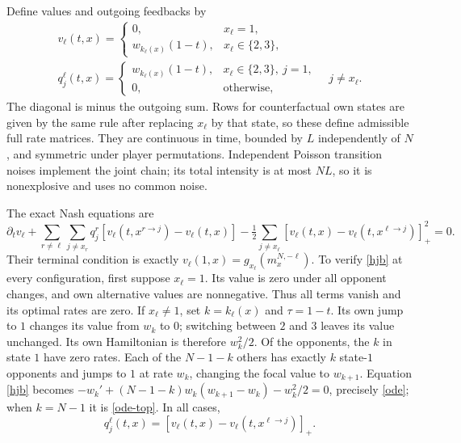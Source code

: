 \documentclass[11pt,a4paper]{article}
\begin{document}
Define values and outgoing feedbacks by
\begin{equation}\label{values}
 \begin{aligned}
 v_\ell(t,x)=\begin{cases}0,&x_\ell=1,\\
 w_{k_\ell(x)}(1-t),&x_\ell\in\{2,3\},\end{cases}
 \\[3pt]
 q_j^\ell(t,x)=\begin{cases}
 w_{k_\ell(x)}(1-t),&x_\ell\in\{2,3\},\ j=1,\\
 0,&\text{otherwise},
 \end{cases}\quad j\ne x_\ell.
 \end{aligned}
\end{equation}
The diagonal is minus the outgoing sum. Rows for counterfactual own
states are given by the same rule after replacing $x_\ell$ by that
state, so these define admissible full rate matrices. They are continuous
in time, bounded by $L$ independently of $N$, and symmetric under
player permutations. Independent Poisson transition noises implement
the joint chain; its total intensity is at most $NL$, so it is
nonexplosive and uses no common noise.

The exact Nash equations are
\begin{equation}\label{hjb}
 \partial_t v_\ell+
 \sum_{r\ne\ell}\sum_{j\ne x_r}q_j^r
 [v_\ell(t,x^{r\to j})-v_\ell(t,x)]
 -\tfrac12\sum_{j\ne x_\ell}
 [v_\ell(t,x)-v_\ell(t,x^{\ell\to j})]_+^2=0.
\end{equation}
Their terminal condition is exactly
$v_\ell(1,x)=g_{x_\ell}(m^{N,-\ell}_x)$.
To verify \eqref{hjb} at every configuration, first suppose $x_\ell=1$.
Its value is zero under all opponent changes, and own alternative
values are nonnegative. Thus all terms vanish and its optimal rates
are zero. If $x_\ell\ne1$, set $k=k_\ell(x)$ and $\tau=1-t$.
Its own jump to $1$ changes its value from $w_k$ to $0$; switching
between $2$ and $3$ leaves its value unchanged. Its own Hamiltonian
is therefore $w_k^2/2$. Of the opponents, the $k$ in state $1$ have
zero rates. Each of the $N-1-k$ others has exactly $k$ state-$1$
opponents and jumps to $1$ at rate $w_k$, changing the focal value
to $w_{k+1}$. Equation \eqref{hjb} becomes
$-w_k'+(N-1-k)w_k(w_{k+1}-w_k)-w_k^2/2=0$, precisely
\eqref{ode}; when $k=N-1$ it is \eqref{ode-top}. In all cases,
\begin{equation}\label{optimal-rate}
 q_j^\ell(t,x)=[v_\ell(t,x)-v_\ell(t,x^{\ell\to j})]_+.
\end{equation}
\end{document}
